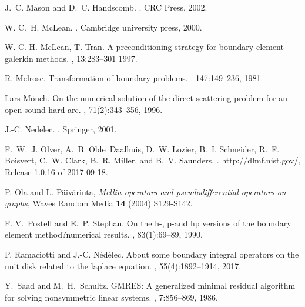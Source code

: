\documentclass[a4paper]{article}
\begin{document}
\begin{thebibliography}{10}
J.~C. Mason and D.~C. Handscomb.
.
\newblock CRC Press, 2002.

W. C.~H. McLean.
.
\newblock Cambridge university press, 2000.

{W. C. H. McLean, T. Tran}.
\newblock A preconditioning strategy for boundary element galerkin methods.
, 13:283--301 1997.

 R. Melrose. Transformation of boundary problems. . 147:149--236, 1981.


Lars M{\"o}nch.
\newblock On the numerical solution of the direct scattering problem for an
  open sound-hard arc.
,
  71(2):343--356, 1996.

J.-C. Nedelec. . \newblock Springer, 2001.

F.~W.~J. Olver, A.~B. Olde~Daalhuis, D.~W. Lozier, B.~I. Schneider, R.~F.
  Boisvert, C.~W. Clark, B.~R. Miller, and B.~V. Saunders.
.
\newblock http://dlmf.nist.gov/, Release 1.0.16 of 2017-09-18.

 P. Ola and L. P\"aiv\"arinta, {\em Mellin operators and pseudodifferential operators on graphs}, Waves Random Media {\bf 14} (2004) S129-S142.

F. V.~Postell and E.~P. Stephan.
\newblock On the h-, p-and hp versions of the boundary element
  method?numerical results.
,
  83(1):69--89, 1990.

P. Ramaciotti and J.-C. N{\'e}d{\'e}lec.
\newblock About some boundary integral operators on the unit disk related to
  the laplace equation.
, 55(4):1892--1914, 2017.

 Y.~Saad and M.~H.~Schultz. 
\newblock GMRES: A generalized minimal residual algorithm for solving nonsymmetric linear systems.
, 7:856--869, 1986.


\end{thebibliography}
\end{document}
